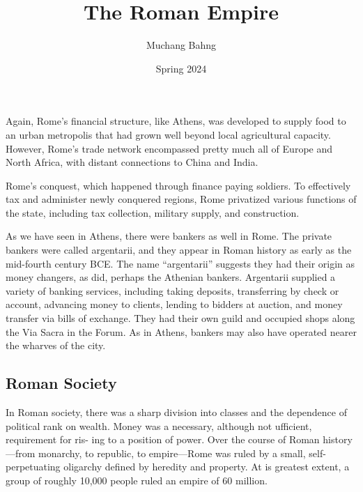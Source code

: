 \documentclass{article}
\begin{document}
\title{The Roman Empire}
\author{Muchang Bahng}
\date{Spring 2024}

\maketitle
\tableofcontents
\pagebreak

\section{} 
  
  Again, Rome's financial structure, like Athens, was developed to supply food to an urban metropolis that had grown well beyond local agricultural capacity. However, Rome's trade network encompassed pretty much all of Europe and North Africa, with distant connections to China and India. 

  Rome's conquest, which happened through finance paying soldiers. To effectively tax and administer newly conquered regions, Rome privatized various functions of the state, including tax collection, military supply, and construction.  

  As we have seen in Athens, there were bankers as well in Rome. The private bankers were called argentarii, and they appear in Roman history as early as the mid-fourth century BCE. The name “argentarii” suggests they had their origin as money changers, as did, perhaps the Athenian bankers. Argentarii supplied a variety of banking services, including taking deposits, transferring by check or account, advancing money to clients, lending to bidders at auction, and money transfer via bills of exchange. They had their own guild and occupied shops along the Via Sacra in the Forum. As in Athens, bankers may also have operated nearer the wharves of the city. 

  \subsection{Roman Society}

    In Roman society, there was a sharp division into classes and the dependence of political rank on wealth. Money was a necessary, although not ufficient, requirement for ris- ing to a position of power. Over the course of Roman history—from monarchy, to republic, to empire—Rome was ruled by a small, self- perpetuating oligarchy defined by heredity and property. At is greatest extent, a group of roughly 10,000 people ruled an empire of 60 million. 
\end{document}
